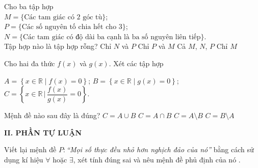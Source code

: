 \begin{ex}%
Cho ba tập hợp\\
$M=\{\text{Các tam giác có 2 góc tù}\}$;\\
$P=\{\text{Các số nguyên tố chia hết cho 3}\}$;\\
$N=\{\text{Các tam giác có độ dài ba cạnh là ba số nguyên liên tiếp}\}$.\\
Tập hợp nào là tập hợp rỗng?
\choice
{Chỉ $N$ và $P$}
{Chỉ $P$ và $M$ }
{Cả $M$, $N$, $P$}
{\True Chỉ $M$}
\end{ex}

\begin{ex}%
Cho hai đa thức $f(x)$ và $g(x)$. Xét các tập hợp
\begin{center}
$A=\left \{x\in \mathbb{R} \mid f(x)=0 \right \}$; $B=\left \{x\in \mathbb{R} \mid g(x)=0 \right \}$; $C=\left \{x\in \mathbb{R} \, \Bigg | \, \dfrac{f(x)}{g(x)} =0 \right \}.$
\end{center}
Mệnh đề nào sau đây là đúng? 
\choice
{$C=A\cup B$}
{$C=A\cap B$}
{\True $C=A\setminus B$}
{$C=B\setminus A$}
\end{ex}

\noindent\textbf{II. PHẦN TỰ LUẬN}
\begin{bt}%
Viết lại mệnh đề \textit{$P\colon$``Mọi số thực đều nhỏ hơn nghịch đảo của nó''} bằng cách sử dụng kí hiệu $\forall$ hoặc $\exists$, xét tính đúng sai và nêu mệnh đề phủ định của nó .
\end{bt}

